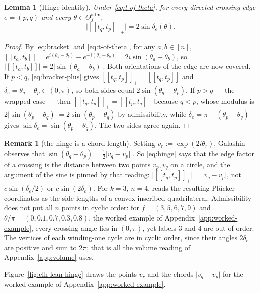 \documentclass[11pt]{article}
\newtheorem{lemma}[theorem]{Lemma}
\theoremstyle{definition}
\newtheorem{remark}[theorem]{Remark}
\newcommand{\Theadm}{\Theta_f^{\mathrm{adm}}}
\begin{document}
\begin{lemma}[Hinge identity]\label{lem:hinge}
Under \eqref{eq:t-of-theta}, for every directed crossing edge $e=(p,q)$ and every $\theta\in\Theadm$,
\begin{equation}\label{eq:hinge}
   \bigl\lvert[\![t_q,t_p]\!]_+\bigr\rvert=2\sin\delta_e(\theta).
\end{equation}
\end{lemma}

\begin{proof}
By \eqref{eq:bracket} and \eqref{eq:t-of-theta}, for any $a,b\in[n]$,
$[\![t_a,t_b]\!]=e^{i(\theta_a-\theta_b)}-e^{-i(\theta_a-\theta_b)}=2i\sin(\theta_a-\theta_b)$, so
$\lvert[\![t_a,t_b]\!]\rvert=2\lvert\sin(\theta_a-\theta_b)\rvert$. Both orientations of the edge are now
covered. If $p<q$, \eqref{eq:bracket-plus} gives $[\![t_q,t_p]\!]_+=[\![t_q,t_p]\!]$ and
$\delta_e=\theta_q-\theta_p\in(0,\pi)$, so both sides equal $2\sin(\theta_q-\theta_p)$. If $p>q$ --- the
wrapped case --- then $[\![t_q,t_p]\!]_+=[\![t_p,t_q]\!]$ because $q<p$, whose modulus is
$2\lvert\sin(\theta_p-\theta_q)\rvert=2\sin(\theta_p-\theta_q)$ by admissibility, while
$\delta_e=\pi-(\theta_p-\theta_q)$ gives $\sin\delta_e=\sin(\theta_p-\theta_q)$. The two sides agree
again.
\end{proof}

\begin{remark}[the hinge is a chord length]\label{rem:chord}
Setting $v_r:=\exp(2i\theta_r)$, Galashin observes that $\sin(\theta_q-\theta_p)=\tfrac12\lvert
v_q-v_p\rvert$ \cite[Rem.~1.2]{Galashin}. So \eqref{eq:hinge} says that the edge factor of a crossing is
the distance between two points $v_p,v_q$ on a circle, and the argument of the sine is pinned by that
reading: $\lvert[\![t_q,t_p]\!]_+\rvert=\lvert v_q-v_p\rvert$, not $c\sin(\delta_e/2)$ or
$c\sin(2\delta_e)$. For $k=3$, $n=4$, \cite[Ex.~1.9]{Galashin} reads the resulting Pl\"ucker coordinates
as the side lengths of a convex inscribed quadrilateral. Admissibility does not put all $n$ points in
cyclic order: for $f=(3,5,6,7,9)$ and $\theta/\pi=(0,0.1,0.7,0.3,0.8)$, the worked example of
Appendix~\ref{app:worked-example}, every crossing angle lies in $(0,\pi)$,
yet labels $3$ and $4$ are out of order. The vertices of each winding-one cycle are in cyclic order, since
their angles $2\delta_e$ are positive and sum to $2\pi$; that is all the volume reading of
Appendix~\ref{app:volume} uses.
\end{remark}

Figure~\ref{fig:clh-lean-hinge} draws the points $v_r$ and the chords $\lvert v_q-v_p\rvert$ for the worked example of Appendix~\ref{app:worked-example}.
\end{document}
